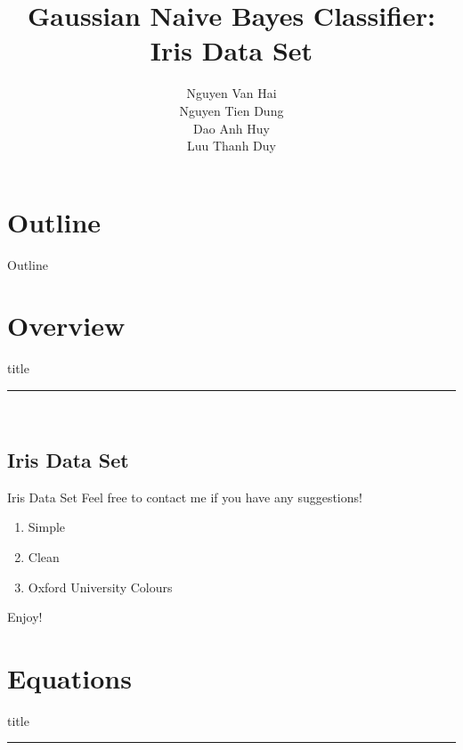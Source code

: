 \documentclass{beamer}
\title{Gaussian Naive Bayes Classifier: Iris Data Set}
\author{Nguyen Van Hai \\ Nguyen Tien Dung \\ Dao Anh Huy \\ Luu Thanh Duy}
\institute{Ton Duc Thang University}
\date{} %
\begin{document}
{ 
\frame{\titlepage}}

\section*{Outline}\begin{frame}{Outline}\tableofcontents\end{frame}

\section{Overview}
    \begin{frame}[plain]
        \vfill
      \centering
      \begin{beamercolorbox}[sep=8pt,center,shadow=true,rounded=true]{title}
        \insertsectionhead\par%
        \color{oxfordblue}\noindent\rule{10cm}{1pt} \\
        \LARGE{\faFileTextO}
      \end{beamercolorbox}
      \vfill
  \end{frame}


\subsection{Iris Data Set}
\begin{frame}{Iris Data Set}
Feel free to contact me if you have any suggestions! \href{https://github.com/CEPav}{\faGithub}

\begin{enumerate}
    \item Simple
    \item Clean
    \item Oxford University Colours
\end{enumerate}
\vspace{1cm}
\begin{center}
    Enjoy! \faSmileO
\end{center}
\end{frame}


\section{Equations}
    \begin{frame}[plain]
        \vfill
      \centering
      \begin{beamercolorbox}[sep=8pt,center,shadow=true,rounded=true]{title}
        \insertsectionhead\par%
        \color{oxfordblue}\noindent\rule{10cm}{1pt} \\
        \LARGE{\faFileTextO}
      \end{beamercolorbox}
      \vfill
  \end{frame}
  
\end{document}
